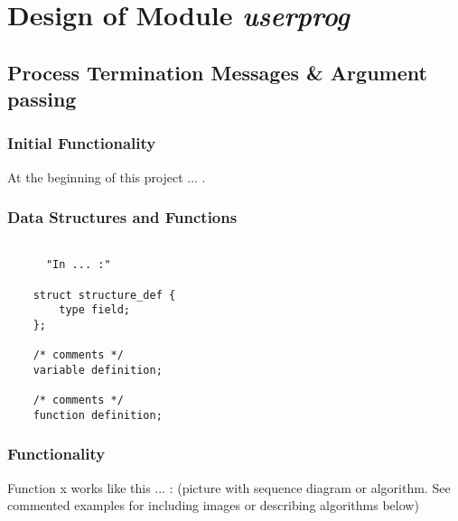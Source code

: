 
\chapter{Design of Module \textit{userprog}}


\section{Process Termination Messages \& Argument passing}

    \subsection{Initial Functionality}

	At the beginning of this project ... .

    \subsection{Data Structures and Functions}

    \begin{lstlisting}

      "In ... :"
	
	struct structure_def {
	    type field;
	};

	/* comments */
	variable definition;

	/* comments */
	function definition;

    \end{lstlisting}


    \subsection{Functionality}

	Function x works like this ... : (picture with sequence diagram or algorithm. See commented examples for including images or describing algorithms below)




